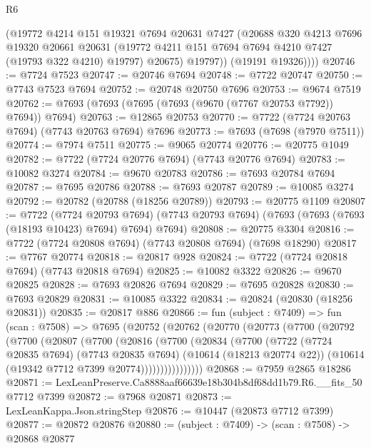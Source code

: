 \begin{lexlean}{R6}
\begin{coremodule}
            (@19772
              @4214
              @151
              @19321
              @7694
              @20631
              @7427
              (@20688
                @320
                @4213
                @7696
                @19320
                @20661
                @20631
                (@19772 @4211 @151 @7694 @7694 @4210 @7427 (@19793 @322 @4210) @19797)
                @20675)
              @19797))
          (@19191 @19326))))
@20746 := @7724 @7523
@20747 := @20746 @7694
@20748 := @7722 @20747
@20750 := @7743 @7523 @7694
@20752 := @20748 @20750 @7696
@20753 := @9674 @7519
@20762 := @7693 (@7693 (@7695 (@7693 (@9670 (@7767 @20753 @7792)) @7694)) @7694)
@20763 := @12865 @20753
@20770 := @7722 (@7724 @20763 @7694) (@7743 @20763 @7694) @7696
@20773 := @7693 (@7698 (@7970 @7511))
@20774 := @7974 @7511
@20775 := @9065 @20774
@20776 := @20775 @1049
@20782 := @7722 (@7724 @20776 @7694) (@7743 @20776 @7694)
@20783 := @10082 @3274
@20784 := @9670 @20783
@20786 := @7693 @20784 @7694
@20787 := @7695 @20786
@20788 := @7693 @20787
@20789 := @10085 @3274
@20792 := @20782 (@20788 (@18256 @20789))
@20793 := @20775 @1109
@20807 := @7722
    (@7724 @20793 @7694)
    (@7743 @20793 @7694)
    (@7693 (@7693 (@7693 (@18193 @10423) @7694) @7694) @7694)
@20808 := @20775 @3304
@20816 := @7722 (@7724 @20808 @7694) (@7743 @20808 @7694) (@7698 @18290)
@20817 := @7767 @20774
@20818 := @20817 @928
@20824 := @7722 (@7724 @20818 @7694) (@7743 @20818 @7694)
@20825 := @10082 @3322
@20826 := @9670 @20825
@20828 := @7693 @20826 @7694
@20829 := @7695 @20828
@20830 := @7693 @20829
@20831 := @10085 @3322
@20834 := @20824 (@20830 (@18256 @20831))
@20835 := @20817 @886
@20866 := fun (subject : @7409) =>
  fun (scan : @7508) =>
  @7695
    (@20752
      (@20762
        (@20770
          (@20773
            (@7700
              (@20792
                (@7700
                  (@20807
                    (@7700
                      (@20816
                        (@7700
                          (@20834
                            (@7700
                              (@7722
                                (@7724 @20835 @7694)
                                (@7743 @20835 @7694)
                                (@10614 (@18213 @20774 @22))
                                (@10614 (@19342 @7712 @7399 @20774))))))))))))))))
@20868 := @7959 @2865 @18286
@20871 := LexLeanPreserve.Ca8888aaf66639e18b304b8df68dd1b79.R6.__fits_50 @7712 @7399
@20872 := @7968 @20871
@20873 := LexLeanKappa.Json.stringStep
@20876 := @10447 (@20873 @7712 @7399)
@20877 := @20872 @20876
@20880 := (subject : @7409) -> (scan : @7508) -> @20868 @20877

\end{coremodule}
\end{lexlean}
